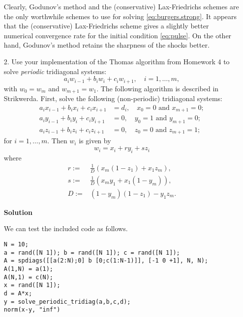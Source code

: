 \documentclass{article}
\begin{document}
\begin{itemize}
Clearly, Godunov's method and the (conservative) Lax-Friedrichs schemes are the only worthwhile schemes to use for solving \eqref{eq:burgers.strong}. It appears that the (conservative) Lax-Friedrichs scheme gives a slightly better numerical convergence rate for the initial condition \eqref{eq:pulse}. On the other hand, Godunov's method retains the sharpness of the shocks better.

\item[2.] Use your implementation of the Thomas algorithm from Homework 4 to solve \emph{periodic} tridiagonal systems:
\begin{equation*}
a_i w_{i-1} + b_i w_i + c_i w_{i+1}, \quad i = 1, \dotsc, m,
\end{equation*}
with $w_0 = w_m$ and $w_{m+1} = w_1$. The following algorithm is described in Strikwerda. First, solve the following (non-periodic) tridiagonal systems:
\begin{align*}
a_i x_{i-1} + b_i x_i + c_i x_{i+1} & = d_i, \quad x_0 = 0 \text{ and } x_{m+1} = 0; \\
a_i y_{i-1} + b_i y_i + c_i y_{i+1} & = 0,   \quad y_0 = 1 \text{ and } y_{m+1} = 0; \\
a_i z_{i-1} + b_i z_i + c_i z_{i+1} & = 0,   \quad z_0 = 0 \text{ and } z_{m+1} = 1;
\end{align*}
for $i = 1, \dotsc, m$. Then $w_i$ is given by
\begin{equation*}
w_i = x_i + r y_i + s z_i
\end{equation*}
where
\begin{align*}
r := {} & \frac{1}{D} \left( x_m \left( 1 - z_1 \right) + x_1 z_m \right), \\
s := {} &  \frac{1}{D} \left( x_m y_1 + x_1 \left( 1 - y_m \right) \right), \\
D := {} & \left( 1 - y_m \right) \left( 1 - z_1 \right) - y_1 z_m.
\end{align*}

\textbf{Solution}

We can test the included code as follows.

\begin{verbatim}
N = 10;
a = rand([N 1]); b = rand([N 1]); c = rand([N 1]);
A = spdiags([[a(2:N);0] b [0;c(1:N-1)]], [-1 0 +1], N, N);
A(1,N) = a(1);
A(N,1) = c(N);
x = rand([N 1]);
d = A*x;
y = solve_periodic_tridiag(a,b,c,d);
norm(x-y, "inf")
\end{verbatim}

\end{itemize}
\end{document}
